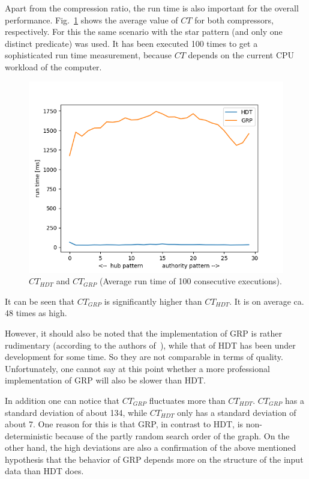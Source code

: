 Apart from the compression ratio, the run time is also important for the overall performance. Fig.~\ref{fig:runtimes} shows the average value of $CT$ for both compressors, respectively. For this the same scenario with the star pattern (and only one distinct predicate) was used. It has been executed 100 times to get a sophisticated run time measurement, because $CT$ depends on the current CPU workload of the computer.

\begin{figure}
	\centering
	\includegraphics[width=0.7\linewidth]{figures/GRPvsHDT/runtimes}
	\caption{$CT_{HDT}$ and $CT_{GRP}$ (Average run time of 100 consecutive executions).}
	\label{fig:runtimes}
\end{figure}


It can be seen that $CT_{GRP}$ is significantly higher than $CT_{HDT}$. It is on average ca. 48 times as high.

However, it should also be noted that the implementation of GRP is rather rudimentary  (according to the authors of~\cite{maneth}), while that of HDT has been under development for some time. So they are not comparable in terms of quality. Unfortunately, one cannot say at this point whether a more professional implementation of GRP will also be slower than HDT.

In addition one can notice that $CT_{GRP}$ fluctuates more than $CT_{HDT}$. $CT_{GRP}$ has a standard deviation of about 134, while $CT_{HDT}$ only has a standard deviation of about 7. One reason for this is that GRP, in contrast to HDT, is non-deterministic because of the partly random search order of the graph. On the other hand, the high deviations are also a confirmation of the above mentioned hypothesis that the behavior of GRP depends more on the structure of the input data than HDT does.



